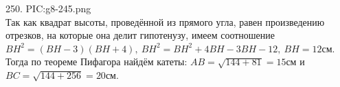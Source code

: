 250. {{PIC:g8-245.png}}\\
Так как квадрат высоты, проведённой из прямого угла, равен произведению отрезков, на которые она делит гипотенузу, имеем соотношение $BH^2=(BH-3)(BH+4),\ BH^2=BH^2+4BH-3BH-12,\ BH=12$см. Тогда по теореме Пифагора найдём катеты:
$AB=\sqrt{144+81}=15$см и $BC=\sqrt{144+256}=20$см.\newpage\noindent
